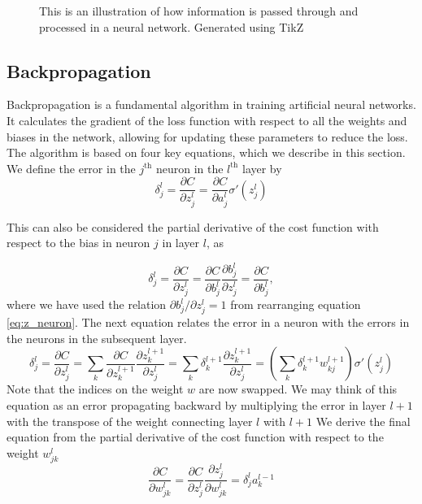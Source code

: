 \begin{figure}[H]
    \centering
    
    \caption{This is an illustration of how information is passed through and processed in a neural network.
Generated using TikZ \cite{tikz}}
    \label{fig:nnfig}
\end{figure}




\subsection{Backpropagation}
Backpropagation\cite{backprop_original} is a fundamental algorithm in training artificial neural networks.
It calculates the gradient of the loss function with respect to all the weights and biases in the network,
allowing for updating these parameters to reduce the loss.
The algorithm is based on four key equations, which we describe in this section.\\

We define the error in the $j^\text{th}$ neuron in the $l^\text{th}$ layer by
\begin{equation}\label{eq:bp1} 
    \delta_j^l = \frac{\partial C}{\partial z_j^l} = \frac{\partial C}{\partial a_j^l} \sigma '(z_j^l)
\end{equation}

This can also be considered the partial derivative of the cost function with respect to the bias in neuron $j$ in layer $l$, as 

\begin{equation}\label{eq:bp2}
    \delta_j^l = \frac{\partial C}{\partial z_j^l} = \frac{\partial C}{\partial b_j^l} \frac{\partial b_j^l }{\partial z_j^l} = \frac{\partial C}{\partial b_j^l},
\end{equation}
where we have used the relation $\partial b_j^l / \partial z_j^l = 1$ from rearranging equation \eqref{eq:z_neuron}.
The next equation relates the error in a neuron with the errors in the neurons in the subsequent layer.
\begin{equation}\label{eq:bp3}
    \delta_j^l = \frac{\partial C}{\partial z_j^l} = \sum_k \frac{\partial C}{\partial z_k^{l+1}} \frac{\partial z_k^{l+1}}{\partial z_j^l} = \sum_k \delta_k^{l+1} \frac{\partial z_k^{l+1}}{\partial z_j^l} = \left( \sum_k \delta_k^{l+1} w_{kj}^{l+1} \right) \sigma '(z_j^l)
\end{equation}
Note that the indices on the weight $w$ are now swapped.
We may think of this equation as an error propagating backward by multiplying the error in layer $l+1$ with the transpose of the weight connecting layer $l$ with $l+1$
We derive the final equation from the partial derivative of the cost function with respect to the weight $w_{jk}^l$
\begin{equation}\label{eq:bp4}
    \frac{\partial C}{\partial w_{jk}^l} = \frac{\partial C}{\partial z_j^l} \frac{\partial z_j^l}{\partial w_{jk}^l} = \delta_j^l a_k^{l-1}
\end{equation}

